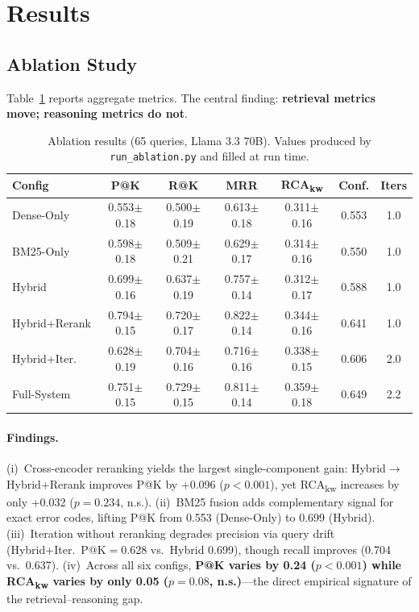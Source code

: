 \documentclass[11pt,a4paper]{article}
\begin{document}

\section{Results}
\label{sec:results}

\subsection{Ablation Study}
\label{sec:ablation}

Table~\ref{tab:ablation} reports aggregate metrics.
The central finding: \textbf{retrieval metrics move; reasoning
metrics do not}.

\begin{table}[h]
\centering
\small
\caption{Ablation results (65 queries, Llama 3.3 70B).
Values produced by \texttt{run\_ablation.py} and filled at run time.}
\label{tab:ablation}
\begin{tabular}{lcccccc}
\toprule
\textbf{Config} & \textbf{P@K} & \textbf{R@K} & \textbf{MRR} & \textbf{RCA\textsubscript{kw}} & \textbf{Conf.} & \textbf{Iters} \\
\midrule
Dense-Only           & 0.553$\pm$0.18 & 0.500$\pm$0.19 & 0.613$\pm$0.18 & 0.311$\pm$0.16 & 0.553 & 1.0 \\
BM25-Only            & 0.598$\pm$0.18 & 0.509$\pm$0.21 & 0.629$\pm$0.17 & 0.314$\pm$0.16 & 0.550 & 1.0 \\
Hybrid               & 0.699$\pm$0.16 & 0.637$\pm$0.19 & 0.757$\pm$0.14 & 0.312$\pm$0.17 & 0.588 & 1.0 \\
Hybrid+Rerank        & 0.794$\pm$0.15 & 0.720$\pm$0.17 & 0.822$\pm$0.14 & 0.344$\pm$0.16 & 0.641 & 1.0 \\
Hybrid+Iter.         & 0.628$\pm$0.19 & 0.704$\pm$0.16 & 0.716$\pm$0.16 & 0.338$\pm$0.15 & 0.606 & 2.0 \\
Full-System          & 0.751$\pm$0.15 & 0.729$\pm$0.15 & 0.811$\pm$0.14 & 0.359$\pm$0.18 & 0.649 & 2.2 \\
\bottomrule
\end{tabular}
\end{table}

\paragraph{Findings.}
(i)~Cross-encoder reranking yields the largest single-component
gain: Hybrid$\to$Hybrid+Rerank improves P@K by +0.096
($p{<}0.001$), yet RCA\textsubscript{kw} increases by only
+0.032 ($p{=}0.234$, n.s.).
(ii)~BM25 fusion adds complementary signal for exact error codes,
lifting P@K from 0.553 (Dense-Only) to 0.699 (Hybrid).
(iii)~Iteration without reranking degrades precision via query drift
(Hybrid+Iter.\ P@K$=$0.628 vs.\ Hybrid 0.699), though recall
improves (0.704 vs.\ 0.637).
(iv)~Across all six configs, \textbf{P@K varies by 0.24
($p{<}0.001$) while RCA\textsubscript{kw} varies by only 0.05
($p{=}0.08$, n.s.)}---the direct empirical signature of the
retrieval--reasoning gap.
\end{document}
